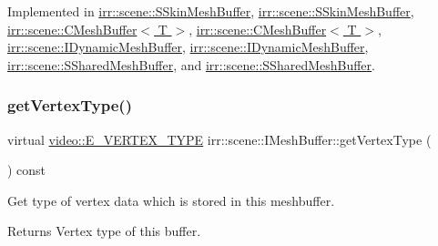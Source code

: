 Implemented in \hyperlink{structirr_1_1scene_1_1SSkinMeshBuffer_a8a249cbb52eba63a694bff2e4a81667b}{irr\+::scene\+::\+S\+Skin\+Mesh\+Buffer}, \hyperlink{structirr_1_1scene_1_1SSkinMeshBuffer_a8a249cbb52eba63a694bff2e4a81667b}{irr\+::scene\+::\+S\+Skin\+Mesh\+Buffer}, \hyperlink{classirr_1_1scene_1_1CMeshBuffer_a341db661218a49d8d8fd12550700cb67}{irr\+::scene\+::\+C\+Mesh\+Buffer$<$ T $>$}, \hyperlink{classirr_1_1scene_1_1CMeshBuffer_a341db661218a49d8d8fd12550700cb67}{irr\+::scene\+::\+C\+Mesh\+Buffer$<$ T $>$}, \hyperlink{classirr_1_1scene_1_1IDynamicMeshBuffer_a3e7523774efaf9a177de6396dfdc14e2}{irr\+::scene\+::\+I\+Dynamic\+Mesh\+Buffer}, \hyperlink{classirr_1_1scene_1_1IDynamicMeshBuffer_a3e7523774efaf9a177de6396dfdc14e2}{irr\+::scene\+::\+I\+Dynamic\+Mesh\+Buffer}, \hyperlink{structirr_1_1scene_1_1SSharedMeshBuffer_af6e2e8a103a2c0713d5a090d92a4edb6}{irr\+::scene\+::\+S\+Shared\+Mesh\+Buffer}, and \hyperlink{structirr_1_1scene_1_1SSharedMeshBuffer_af6e2e8a103a2c0713d5a090d92a4edb6}{irr\+::scene\+::\+S\+Shared\+Mesh\+Buffer}.

\mbox{\label{classirr_1_1scene_1_1IMeshBuffer_a4d7a84ae4416487736f0ed0f519bb4f0}} 
\subsubsection{\texorpdfstring{get\+Vertex\+Type()}{getVertexType()}\hspace{0.1cm}{\footnotesize\ttfamily [2/2]}}
{\footnotesize\ttfamily virtual \hyperlink{namespaceirr_1_1video_a0e3b59e025e0d0db0ed2ee0ce904deac}{video\+::\+E\+\_\+\+V\+E\+R\+T\+E\+X\+\_\+\+T\+Y\+PE} irr\+::scene\+::\+I\+Mesh\+Buffer\+::get\+Vertex\+Type (\begin{DoxyParamCaption}{ }\end{DoxyParamCaption}) const\hspace{0.3cm}{\ttfamily [pure virtual]}}



Get type of vertex data which is stored in this meshbuffer. 

\begin{DoxyReturn}{Returns}
Vertex type of this buffer. 
\end{DoxyReturn}


